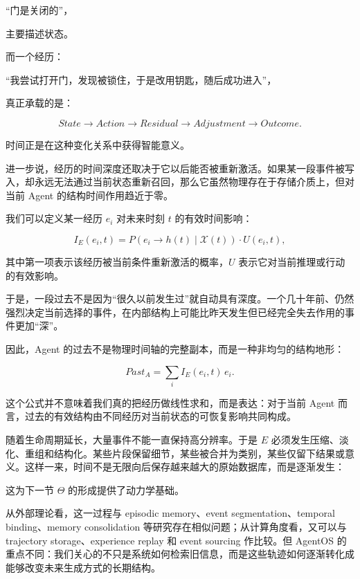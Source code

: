 “门是关闭的”，

主要描述状态。

而一个经历：

“我尝试打开门，发现被锁住，于是改用钥匙，随后成功进入”，

真正承载的是：

\[
State
\rightarrow
Action
\rightarrow
Residual
\rightarrow
Adjustment
\rightarrow
Outcome.
\]

时间正是在这种变化关系中获得智能意义。

进一步说，经历的时间深度还取决于它以后能否被重新激活。如果某一段事件被写入，却永远无法通过当前状态重新召回，那么它虽然物理存在于存储介质上，但对当前 Agent 的结构时间作用趋近于零。

我们可以定义某一经历 $e_i$ 对未来时刻 $t$ 的有效时间影响：

\[
I_E(e_i,t)
=
P\left(
e_i
\rightarrow
h(t)
\mid
\mathcal{X}(t)
\right)
\cdot
U(e_i,t),
\]

其中第一项表示该经历被当前条件重新激活的概率，$U$ 表示它对当前推理或行动的有效影响。

于是，一段过去不是因为“很久以前发生过”就自动具有深度。一个几十年前、仍然强烈决定当前选择的事件，在内部结构上可能比昨天发生但已经完全失去作用的事件更加“深”。

因此，Agent 的过去不是物理时间轴的完整副本，而是一种非均匀的结构地形：

\[
\boxed{
Past_A
=
\sum_i
I_E(e_i,t)\,e_i.
}
\]

这个公式并不意味着我们真的把经历做线性求和，而是表达：对于当前 Agent 而言，过去的有效结构由不同经历对当前状态的可恢复影响共同构成。

随着生命周期延长，大量事件不能一直保持高分辨率。于是 $E$ 必须发生压缩、淡化、重组和结构化。某些片段保留细节，某些被合并为类别，某些仅留下结果或意义。这样一来，时间不是无限向后保存越来越大的原始数据库，而是逐渐发生：

\begin{statementbox}
\centering
{}
\end{statementbox}

这为下一节 $\Theta$ 的形成提供了动力学基础。

从外部理论看，这一过程与 episodic memory、event segmentation、temporal binding、memory consolidation 等研究存在相似问题；从计算角度看，又可以与 trajectory storage、experience replay 和 event sourcing 作比较。但 AgentOS 的重点不同：我们关心的不只是系统如何检索旧信息，而是这些轨迹如何逐渐转化成能够改变未来生成方式的长期结构。

